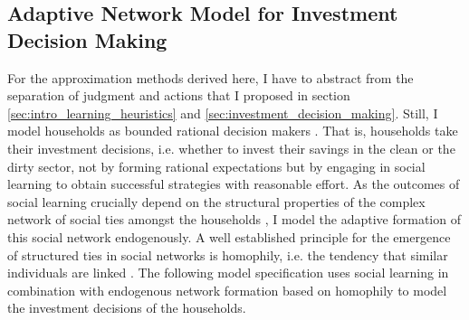\subsection{Adaptive Network Model for Investment Decision Making}
\label{sec:investment_decision_making_descr.}
For the approximation methods derived here, I have to abstract from the separation of judgment and actions that I proposed in section \ref{sec:intro_learning_heuristics} and \ref{sec:investment_decision_making}.
Still, I model households as bounded rational decision makers \citep{simon1972theories, simon1982models, gigerenzer2002bounded}.
That is, households take their investment decisions, i.e. whether to invest their savings in the clean or the dirty sector, not by forming rational expectations \citep{Evans2006, Kirman2014} but by engaging in social learning \citep{Bandura1971} to obtain successful strategies \citep{Traulsen2010} with reasonable effort.
As the outcomes of social learning crucially depend on the structural properties of the complex network of social ties amongst the households \citep{Barkoczi2016}, I model the adaptive formation of this social network endogenously.
A well established principle for the emergence of structured ties in social networks is homophily, i.e. the tendency that similar individuals are linked \citep{McPherson2007, Centola2007, Centola2011}.
The following model specification uses social learning in combination with endogenous network formation based on homophily to model the investment decisions of the households.

